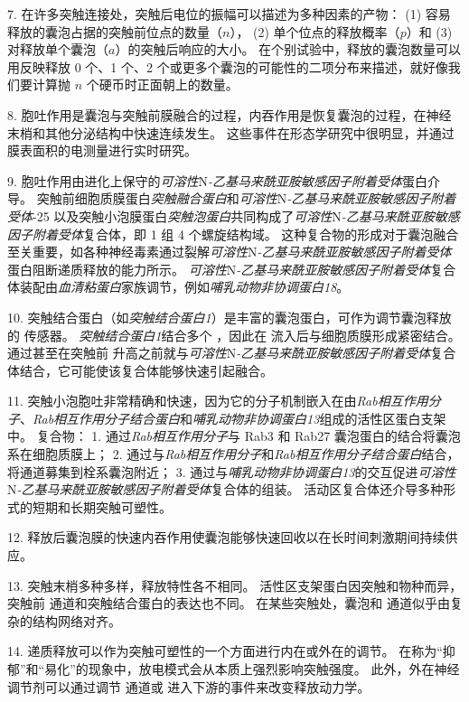 7. 在许多突触连接处，突触后电位的振幅可以描述为多种因素的产物：
(1) 容易释放的囊泡占据的突触前位点的数量（$n$），
(2) 单个位点的释放概率（$p$）和
(3) 对释放单个囊泡（$a$）的突触后响应的大小。
在个别试验中，释放的囊泡数量可以用反映释放 0 个、1 个、2 个或更多个囊泡的可能性的二项分布来描述，就好像我们要计算抛 $n$ 个硬币时正面朝上的数量。


8. 胞吐作用是囊泡与突触前膜融合的过程，内吞作用是恢复囊泡的过程，在神经末梢和其他分泌结构中快速连续发生。
这些事件在形态学研究中很明显，并通过膜表面积的电测量进行实时研究。 


9. 胞吐作用由进化上保守的\textit{可溶性}N\textit{-乙基马来酰亚胺敏感因子附着受体}蛋白介导。
突触前细胞质膜蛋白\textit{突触融合蛋白}和\textit{可溶性}N\textit{-乙基马来酰亚胺敏感因子附着受体}-25 以及突触小泡膜蛋白\textit{突触泡蛋白}共同构成了\textit{可溶性}N\textit{-乙基马来酰亚胺敏感因子附着受体}复合体，即 1 组 4 个螺旋结构域。
这种复合物的形成对于囊泡融合至关重要，如各种神经毒素通过裂解\textit{可溶性}N\textit{-乙基马来酰亚胺敏感因子附着受体}蛋白阻断递质释放的能力所示。
\textit{可溶性}N\textit{-乙基马来酰亚胺敏感因子附着受体}复合体装配由\textit{血清粘蛋白}家族调节，例如\textit{哺乳动物非协调蛋白18}。


10. 突触结合蛋白（如\textit{突触结合蛋白1}）是丰富的囊泡蛋白，可作为调节囊泡释放的  传感器。
\textit{突触结合蛋白1}结合多个 ，因此在  流入后与细胞质膜形成紧密结合。
通过甚至在突触前  升高之前就与\textit{可溶性}N\textit{-乙基马来酰亚胺敏感因子附着受体}复合体结合，它可能使该复合体能够快速引起融合。


11. 突触小泡胞吐非常精确和快速，因为它的分子机制嵌入在由\textit{Rab相互作用分子}、\textit{Rab相互作用分子结合蛋白}和\textit{哺乳动物非协调蛋白13}组成的活性区蛋白支架中。
复合物：
1. 通过\textit{Rab相互作用分子}与 Rab3 和 Rab27 囊泡蛋白的结合将囊泡系在细胞质膜上；
2. 通过与\textit{Rab相互作用分子}和\textit{Rab相互作用分子结合蛋白}结合，将通道募集到栓系囊泡附近；
3. 通过与\textit{哺乳动物非协调蛋白13}的交互促进\textit{可溶性}N\textit{-乙基马来酰亚胺敏感因子附着受体}复合体的组装。
活动区复合体还介导多种形式的短期和长期突触可塑性。


12. 释放后囊泡膜的快速内吞作用使囊泡能够快速回收以在长时间刺激期间持续供应。


13. 突触末梢多种多样，释放特性各不相同。
活性区支架蛋白因突触和物种而异，突触前  通道和突触结合蛋白的表达也不同。
在某些突触处，囊泡和  通道似乎由复杂的结构网络对齐。


14. 递质释放可以作为突触可塑性的一个方面进行内在或外在的调节。
在称为“抑郁”和“易化”的现象中，放电模式会从本质上强烈影响突触强度。
此外，外在神经调节剂可以通过调节  通道或  进入下游的事件来改变释放动力学。




